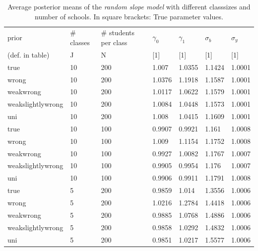 \begin{table}[!ht]
\begin{center}
\begin{tabular}{l  l  l  l  l  l  l  }
prior & \# classes & \#  students per class & $\gamma_0$ & $\gamma_1$  & $\sigma_b$ & $\sigma_y$ \\
(def. in table)  & J  & N &  [1] &  [1]  & [1] & [1] \\
\hline
true & 10  &  200  &  1.007  &  1.0355  &  1.1424  &  1.0001\\
wrong & 10  &  200  &  1.0376  &  1.1918  &  1.1587  &  1.0001\\
weakwrong & 10  &  200  &  1.0117  &  1.0622  &  1.1579  &  1.0001\\
weakslightlywrong & 10  &  200  &  1.0084  &  1.0448  &  1.1573  &  1.0001\\
uni &10  &  200  &  1.008  &  1.0415  &  1.1609  &  1.0001\\
\hline
true &10  &  100  &  0.9907  &  0.9921  &  1.161  &  1.0008\\
wrong & 10  &  100  &  1.009  &  1.1154  &  1.1752  &  1.0008\\
weakwrong & 10  &  100  &  0.9927  &  1.0082  &  1.1767  &  1.0007\\
weakslightlywrong & 10  &  100  &  0.9905  &  0.9954  &  1.176  &  1.0007\\
uni & 10  &  100  &  0.9906  &  0.9911  &  1.1791  &  1.0008\\
\hline
true & 5  &  200  &  0.9859  &  1.014  &  1.3556  &  1.0006\\
wrong & 5  &  200  &  1.0216  &  1.2784  &  1.4418  &  1.0006\\
weakwrong & 5  &  200  &  0.9885  &  1.0768  &  1.4886  &  1.0006\\
weakslightlywrong& 5  &  200  &  0.9858  &  1.0292  &  1.4832  &  1.0006\\
uni & 5  &  200  &  0.9851  &  1.0217  &  1.5577  &  1.0006\\
\end{tabular}
\end{center}
\caption{Average  posterior means of the \emph{random slope model}  with different classsizes and number of schools. In square brackets: True parameter values.}
\label{tab:bias_second}
\end{table}


